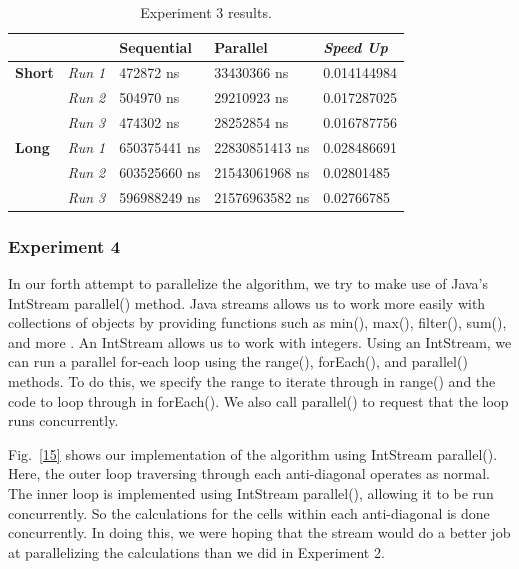 \documentclass[conference]{IEEEtran}
\begin{document}
\begin{table}[]
\caption{Experiment 3 results.}
\label{tab:table3}
\begin{tabular}{|l|l|l|l|l|}
\hline
               & \textbf{}      & \textbf{Sequential} & \textbf{Parallel} & \textit{\textbf{Speed Up}} \\ \hline
\textbf{Short} & \textit{Run 1} & 472872 ns           & 33430366 ns       & 0.014144984                \\ \hline
               & \textit{Run 2} & 504970 ns           & 29210923 ns       & 0.017287025                \\ \hline
               & \textit{Run 3} & 474302 ns           & 28252854 ns       & 0.016787756                \\ \hline
\textbf{Long}  & \textit{Run 1} & 650375441 ns        & 22830851413 ns    & 0.028486691                \\ \hline
               & \textit{Run 2} & 603525660 ns        & 21543061968 ns    & 0.02801485                 \\ \hline
               & \textit{Run 3} & 596988249 ns        & 21576963582 ns    & 0.02766785                 \\ \hline
\end{tabular}
\end{table}

\subsubsection{Experiment 4}
In our forth attempt to parallelize the algorithm, we try to make use of Java's IntStream parallel() method. Java streams allows us to work more easily with collections of objects by providing functions such as min(), max(), filter(), sum(), and more \cite{baeldung_2019}. An IntStream allows us to work with integers. Using an IntStream, we can run a parallel for-each loop using the range(), forEach(), and parallel() methods. To do this, we specify the range to iterate through in range() and the code to loop through in forEach(). We also call parallel() to request that the loop runs concurrently.

Fig.~\ref{15} shows our implementation of the algorithm using IntStream parallel(). Here, the outer loop traversing through each anti-diagonal operates as normal. The inner loop is implemented using IntStream parallel(), allowing it to be run concurrently. So the calculations for the cells within each anti-diagonal is done concurrently. In doing this, we were hoping that the stream would do a better job at parallelizing the calculations than we did in Experiment 2.
\end{document}
